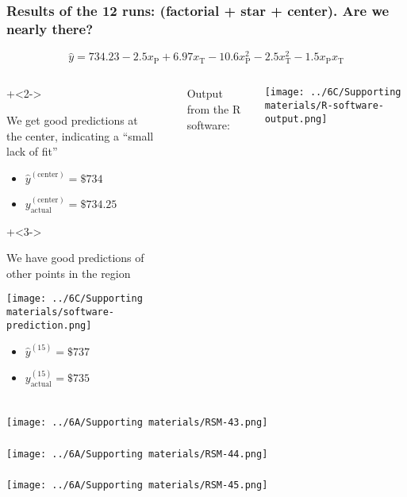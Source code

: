 \begin{frame}\frametitle{Results of the 12 runs: (factorial + star + center). Are we nearly there?}
	\[\hat{y} = 734.23 -2.5x_\text{P}    +    6.97  x_\text{T}    -10.6  x^2_\text{P}     -2.5  x^2_\text{T}     -1.5x_\text{P}x_\text{T}\]
	\begin{columns}[T]
			\begin{enumerate}
				\onslide+<2->{
					\item	We get good predictions at the center,
							indicating a ``small lack of fit''
							\begin{itemize}
								\item	$\hat{y}^{(\text{center})} = \$ 734$
								\item	$y^{(\text{center})}_\text{actual} = \$ 734.25$
							\end{itemize}
				}
				\onslide+<3->{
					\vspace{0.5cm}
					\item	We have good predictions of other points in the region
						\centerline{\texttt{[image: ../6C/Supporting materials/software-prediction.png]}}
						\vspace{-0.3cm}
						\begin{itemize}
							\item	$\hat{y}^{(15)} = \$ 737$
							\item	$y^{(15)}_\text{actual} = \$ 735$
						\end{itemize}
					}
			\end{enumerate}
			
			\rule[3mm]{0.01cm}{60mm}%
		
			Output from the R software:

			\centerline{\texttt{[image: ../6C/Supporting materials/R-software-output.png]}}

	\end{columns}
	
	
\end{frame}
\begin{frame}\frametitle{}
	\centerline{\texttt{[image: ../6A/Supporting materials/RSM-43.png]}}
\end{frame}
\begin{frame}\frametitle{}
	\centerline{\texttt{[image: ../6A/Supporting materials/RSM-44.png]}}
\end{frame}
\begin{frame}\frametitle{}
	\centerline{\texttt{[image: ../6A/Supporting materials/RSM-45.png]}}
\end{frame}
